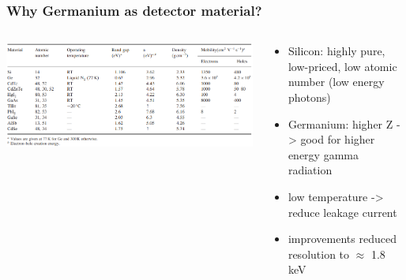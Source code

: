 \documentclass[aspectratio=1610, 12pt]{beamer}
\begin{document}
\begin{frame}\frametitle{Why Germanium as detector material?}
  \begin{columns}
    \begin{column}[c]{0.48\textwidth}
      \includegraphics[width=\textwidth]{plots/candidates.png}
    \end{column}
    \begin{column}[c]{0.48\textwidth}
      \begin{itemize}
        \item Silicon: highly pure, low-priced, low atomic number (low energy photons)
        \item Germanium: higher Z -> good for higher energy gamma radiation
        \item low temperature -> reduce leakage current
        \item improvements reduced resolution to $\approx$ 1.8 keV
      \end{itemize}
    \end{column}
  \end{columns}
\end{frame}
\end{document}

